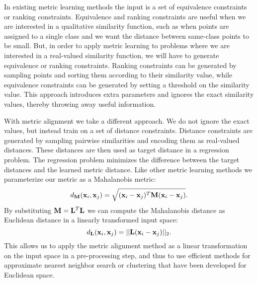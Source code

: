 In existing metric learning methods the input is a set of equivalence constraints or ranking constraints. Equivalence and ranking constraints are useful when we are interested in a qualitative similarity function, such as when points are assigned to a single class and we want the distance between same-class points to be small. But, in order to apply metric learning to problems where we are interested in a real-valued similarity function, we will have to generate equivalence or ranking constraints. Ranking constraints can be generated by sampling points and sorting them according to their similarity value, while equivalence constraints can be generated by setting a threshold on the similarity value. This approach introduces extra parameters and ignores the exact similarity values, thereby throwing away useful information.


With metric alignment we take a different approach. We do not ignore the exact values, but instead train on a set of distance constraints. Distance constraints are generated by sampling pairwise similarities and encoding them as real-valued distances. These distances are then used as target distance in a regression problem. The regression problem minimizes the difference between the target distances and the learned metric distance. Like other metric learning methods we parameterize our metric as a Mahalanobis metric:  
\begin{equation}
d_{\mathbf{M}}(\mathbf{x}_i, \mathbf{x}_j) = \sqrt{(\mathbf{x}_i-\mathbf{x}_j)^T \mathbf{M} (\mathbf{x}_i - \mathbf{x}_j)}.
\label{eq:mahalanobis}
\end{equation}
By substituting $\mathbf{M} = \mathbf{L}^T \mathbf{L}$ we can compute the Mahalanobis distance as Euclidean distance in a linearly transformed input space:
\begin{equation}
d_{\mathbf{L}}(\mathbf{x}_i, \mathbf{x}_j) =  ||\mathbf{L} (\mathbf{x}_i - \mathbf{x}_j)||_2.
\label{eq:mahalanobis_transformation}
\end{equation}
This allows us to apply the metric alignment method as a linear transformation on the input space in a pre-processing step, and thus to use efficient methods for approximate nearest neighbor search or clustering that have been developed for Euclidean space. %

